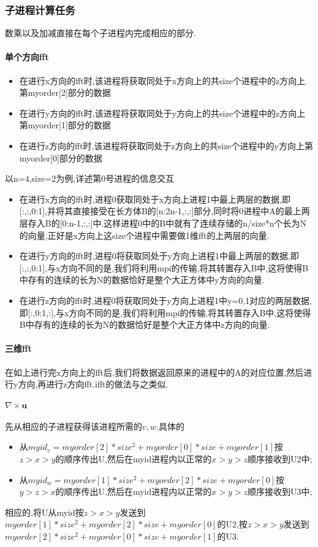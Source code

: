 \documentclass[UTF8]{ctexart}
\begin{document}
\subsubsection{子进程计算任务}
数乘以及加减直接在每个子进程内完成相应的部分.
\paragraph{单个方向fft}
\begin{itemize}
\item 在进行x方向的fft时,该进程将获取同处于x方向上的共size个进程中的z方向上第myorder[2]部分的数据
\item 在进行y方向的fft时,该进程将获取同处于y方向上的共size个进程中的z方向上第myorder[1]部分的数据
\item 在进行z方向的fft时,该进程将获取同处于z方向上的共size个进程中的y方向上第myorder[0]部分的数据
\end{itemize}
以n=4,size=2为例,详述第0号进程的信息交互
\begin{itemize}
\item 在进行x方向的fft时,进程0获取同处于x方向上进程1中最上两层的数据,即[:,:,0:1],并将其直接接受在长方体B的[n:2n-1,:,:]部分,同时将0进程中A的最上两层存入B的[0:n-1,:,:]中.这样进程0中的B中就有了连续存储的n/size*n个长为N的向量,正好是x方向上这size个进程中需要做1维fft的上两层的向量.
\item 在进行y方向的fft时,进程0将获取同处于y方向上进程1中最上两层的数据,即[:,:,0:1],与x方向不同的是,我们将利用mpi的传输,将其转置存入B中,这将使得B中存有的连续的长为N的数据恰好是整个大正方体中y方向的向量.
\item  在进行z方向的fft时,进程0将获取同处于y方向上进程1中y=0,1对应的两层数据,即[:,0:1,:],与x方向不同的是,我们将利用mpi的传输,将其转置存入B中,这将使得B中存有的连续的长为N的数据恰好是整个大正方体中z方向的向量.
\end{itemize}
\paragraph{三维fft}
在如上进行完x方向上的fft后,我们将数据返回原来的进程中的A的对应位置,然后进行y方向,再进行z方向fft.ifft的做法与之类似.
\paragraph{$\nabla\times\mathbf{u}$}
先从相应的子进程获得该进程所需的$v,w$.具体的
\begin{itemize}
  \item 从$myid_v=myorder[2]*size^2+myorder[0]*size+myorder[1]$按$z> x> y$的顺序传出U,然后在myid进程内以正常的$x> y> z$顺序接收到U2中;
  \item 从$myid_w=myorder[1]*size^2+myorder[2]*size+myorder[0]$按$y>z>x$的顺序传出U,然后在myid进程内以正常的$x>y>z$顺序接收到U3中;
\end{itemize}
相应的,将U从myid按$z> x> y$发送到$myorder[1]*size^2+myorder[2]*size+myorder[0]$的U2,按$z>x>y$发送到$myorder[2]*size^2+myorder[0]*size+myorder[1]$的U3.
\end{document}
